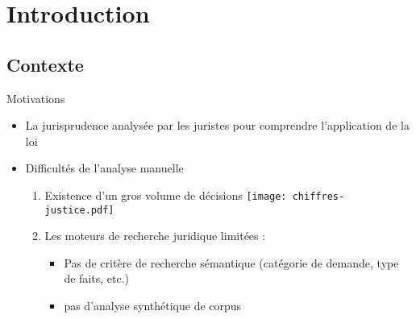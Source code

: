 \section{Introduction}

\subsection{Contexte}
\begin{frame}[t]{\mysubsectiontitle}
	Motivations
	\begin{itemize}
		\item La jurisprudence analysée par les juristes pour comprendre l'application de la loi 
	    \item Difficultés de l'analyse manuelle
	    \begin{enumerate}
	    	\item Existence d'un gros volume de décisions 
	    		\texttt{[image: chiffres-justice.pdf]}   	
			\item Les moteurs de recherche juridique limitées : 
			\begin{itemize}
				\item Pas de critère de recherche sémantique (catégorie de demande, type de faits, etc.)
				\item pas d'analyse synthétique de corpus
			\end{itemize}
	    \end{enumerate}
	\end{itemize}
\end{frame}


